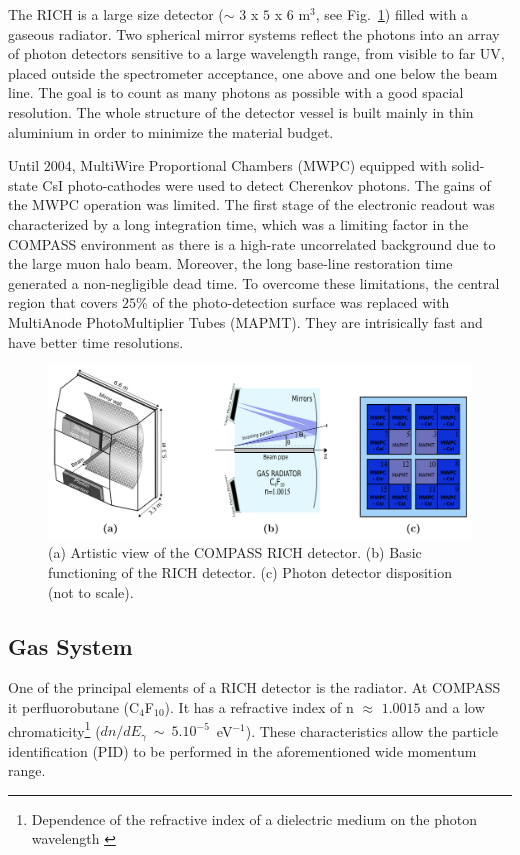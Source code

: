 The RICH is a large size detector ($\sim$ $3$ x $5$ x $6$ m$^3$, see Fig.~\ref{pic:RICHview}) filled with a gaseous radiator. Two spherical mirror systems reflect the photons into an array of photon detectors sensitive to a large wavelength range, from visible to far UV, placed outside the spectrometer acceptance, one above and one below the beam line. The goal is to count as many photons as possible with a good spacial resolution. The whole structure of the detector vessel is built mainly in thin aluminium in order to minimize the material budget.

Until $2004$, MultiWire Proportional Chambers (MWPC) equipped with solid-state CsI photo-cathodes were used to detect Cherenkov photons. The gains of the MWPC operation was limited. The first stage of the electronic readout was characterized by a long integration time, which was a limiting factor in the COMPASS environment as there is a high-rate uncorrelated background due to the large muon halo beam. Moreover, the long base-line restoration time generated a non-negligible dead time. To overcome these limitations, the central region that covers $25$\% of the photo-detection surface was replaced with MultiAnode PhotoMultiplier Tubes (MAPMT). They are intrisically fast and have better time resolutions.

\begin{figure}[!h]
  \centering
	\includegraphics[scale=0.4]{./gfx/RICHview.png}
	\caption{(a) Artistic view of the COMPASS RICH detector. (b) Basic functioning of the RICH detector. (c) Photon detector disposition (not to scale).}
	\label{pic:RICHview}
\end{figure}

\subsection{Gas System}

One of the principal elements of a RICH detector is the radiator. At COMPASS it perfluorobutane (C$_4$F$_{10}$). It has a refractive index of n $\approx$ $1.0015$ and a low chromaticity\footnote{Dependence of the refractive index of a dielectric medium on the photon wavelength \cite{Dispersion}} ($dn/dE_{\gamma}$~$\sim$~$5.10^{-5}$~eV$^{-1}$). These characteristics allow the particle identification (PID) to be performed in the aforementioned wide momentum range.

